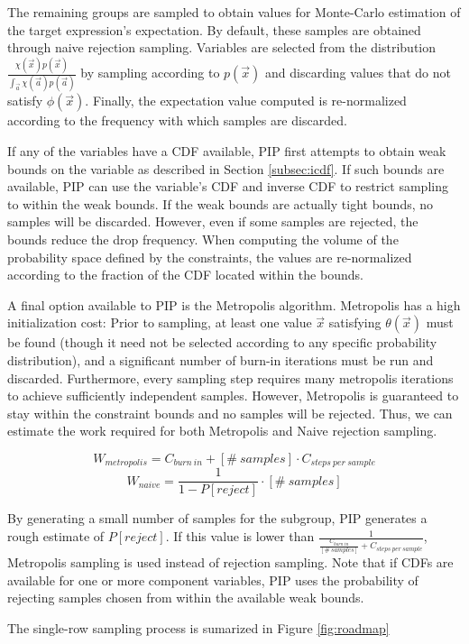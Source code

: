The remaining groups are sampled to obtain values for Monte-Carlo estimation of the target expression's expectation.  By default, these samples are obtained through naive rejection sampling.  Variables are selected from the distribution $\frac{\chi(\vec{x})p(\vec{x})}{\int_{\vec{a}} \chi(\vec{a})p(\vec{a})}$ by sampling according to $p(\vec{x})$ and discarding values that do not satisfy $\phi(\vec{x})$.  Finally, the expectation value computed is re-normalized according to the frequency with which samples are discarded.

If any of the variables have a CDF available, PIP first attempts to obtain weak bounds on the variable as described in Section \ref{subsec:icdf}.  If such bounds are available, PIP can use the variable's CDF and inverse CDF to restrict sampling to within the weak bounds.  If the weak bounds are actually tight bounds, no samples will be discarded.  However, even if some samples are rejected, the bounds reduce the drop frequency.  When computing the volume of the probability space defined by the constraints, the values are re-normalized according to the fraction of the CDF located within the bounds.

A final option available to PIP is the Metropolis algorithm.  Metropolis has a high initialization cost: Prior to sampling, at least one value $\vec x$ satisfying $\theta(\vec x)$ must be found (though it need not be selected according to any specific probability distribution), and a significant number of burn-in iterations must be run and discarded.  Furthermore, every sampling step requires many metropolis iterations to achieve sufficiently independent samples.  However, Metropolis is guaranteed to stay within the constraint bounds and no samples will be rejected.  Thus, we can estimate the work required for both Metropolis and Naive rejection sampling.

$$W_{metropolis} = C_{burn\ in} + [\#\ samples] \cdot C_{steps\ per\ sample}$$
$$W_{naive} = \frac{1}{1-P[reject]} \cdot [\#\ samples]$$

By generating a small number of samples for the subgroup, PIP generates a rough estimate of $P[reject]$.  If this value is lower than $\frac{1}{\frac{C_{burn\ in}}{[\#\ samples]} + C_{steps\ per\ sample}}$, Metropolis sampling is used instead of rejection sampling.  Note that if CDFs are available for one or more component variables, PIP uses the probability of rejecting samples chosen from within the available weak bounds.

The single-row sampling process is sumarized in Figure \ref{fig:roadmap}

